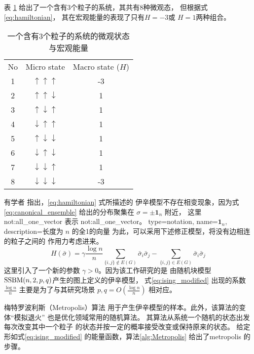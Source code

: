 \begin{example}
  表 \ref{tab:particles_3} 给出了一个含有3个粒子的系统，其共有8种微观态，
  但根据式\eqref{eq:hamiltonian}， 其在宏观能量的表现了只有$H=-3$或 $H=1$两种组合。
\begin{table}
  \centering
\begin{tabular}{ccc}
		No & Micro state & Macro state ($H$) \\
		1 & $\uparrow\uparrow\uparrow$ & -3 \\
		2 & $\uparrow\uparrow\downarrow$ & 1 \\
		3 & $\uparrow\downarrow\uparrow$ & 1 \\
		4 & $\downarrow\uparrow\uparrow$ & 1 \\
		5 & $\uparrow\downarrow\downarrow$ & 1    \\
6 & $\downarrow\uparrow\downarrow$ & 1 \\
7 & $\downarrow\downarrow\uparrow$ & 1 \\
8 & $\downarrow\downarrow\downarrow$ & -3 \\
\end{tabular}
\caption{一个含有3个粒子的系统的微观状态与宏观能量}
\label{tab:particles_3}
\end{table}
\end{example}

有学者\cite{ye2020exact}
指出，\eqref{eq:hamiltonian} 式所描述的
伊辛模型不存在相变现象，因为式\eqref{eq:canonical_ensemble}
给出的分布聚集在 $\sigma=\pm \mathbf{1}_n$ 附近，
这里 \gls{not:all_one_vector} 表示 \glsdesc{not:all_one_vector}。
{
  type=notation,
  name={\ensuremath{\mathbf{1}_n}},
  description={长度为 $n$ 的全1的向量}
}
为此，可以采用下述修正模型，将没有边相连的粒子之间的
作用力考虑进来。
\begin{equation}\label{eq:ising_modified}
  H(\bar{\sigma}) = \gamma \frac{\log n}{n} \sum_{\{i,j\}\not\in E(G)}
  \bar{\sigma}_i  \bar{\sigma}_j
	- \sum_{\{i,j\}\in E(G)}
  \bar{\sigma}_i  \bar{\sigma}_j
\end{equation}
这里引入了一个新的参数 $\gamma > 0$。因为该工作研究的是
由随机块模型 $\operatorname{SSBM}(n,2,p,q)$产生的图上定义的伊辛模型，
式\eqref{eq:ising_modified} 出现的系数
$\frac{\log n}{n}$
主要是为了与其研究场景 $p,q=O(\frac{\log n}{n})$
相对应。

梅特罗波利斯（Metropolis）算法\cite{metropolis1953equation}
用于产生伊辛模型的样本。此外，该算法的变体“模拟退火”
\cite{pincus1970monte} 也是优化领域常用的随机算法。
其算法从系统一个随机的状态出发每次改变其中一个粒子
的状态并按一定的概率接受改变或保持原来的状态。
给定形如式\eqref{eq:ising_modified}
的能量函数，算法\ref{alg:Metropolis}
给出了\gls{metropolis} 的步骤。

